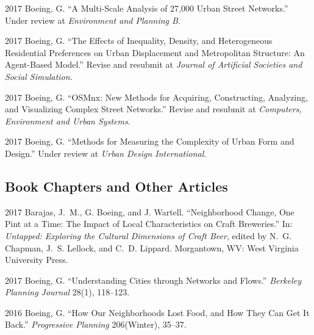 \documentclass{academiccv}
\begin{document}
\begin{tablist}

\item[2017] \tab Boeing, G. \enquote{A Multi-Scale Analysis of 27,000 Urban Street Networks.} Under review at \emph{Environment and Planning B}.

\item[2017] \tab Boeing, G. \enquote{The Effects of Inequality, Density, and Heterogeneous Residential Preferences on Urban Displacement and Metropolitan Structure: An Agent-Based Model.} Revise and resubmit at \emph{Journal of Artificial Societies and Social Simulation}.

\item[2017] \tab Boeing, G. \enquote{OSMnx: New Methods for Acquiring, Constructing, Analyzing, and Visualizing Complex Street Networks.} Revise and resubmit at \emph{Computers, Environment and Urban Systems}.

\item[2017] \tab Boeing, G. \enquote{Methods for Measuring the Complexity of Urban Form and Design.} Under review at \emph{Urban Design International}.

\end{tablist}



\subsection*{Book Chapters and Other Articles}

\begin{tablist}

\item[2017] \tab Barajas, J.~M., G. Boeing, and J. Wartell. \enquote{Neighborhood Change, One Pint at a Time: The Impact of Local Characteristics on Craft Breweries.} In: \emph{Untapped: Exploring the Cultural Dimensions of Craft Beer}, edited by N.~G. Chapman, J.~S. Lellock, and C.~D. Lippard. Morgantown, WV: West Virginia University Press.

\item[2017] \tab Boeing, G. \enquote{Understanding Cities through Networks and Flows.} \emph{Berkeley Planning Journal} 28(1), 118--123.

\item[2016] \tab Boeing, G. \enquote{How Our Neighborhoods Lost Food, and How They Can Get It Back.} \emph{Progressive Planning} 206(Winter), 35--37.

\end{tablist}
\end{document}
